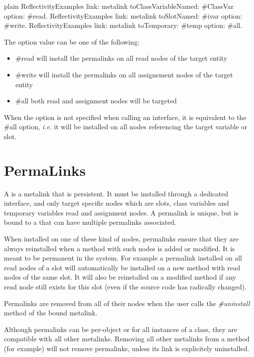 \documentclass[10pt,twoside,english]{_support/latex/sbabook/sbabook}
\begin{document}
\begin{displaycode}{plain}
ReflectivityExamples link: metalink toClassVariableNamed: #ClassVar option: #read.
ReflectivityExamples link: metalink toSlotNamed: #ivar option: #write.
ReflectivityExamples link: metalink toTemporary: #temp option: #all.
\end{displaycode}

The option value can be one of the following:

\begin{itemize}
\item \#read will install the permalinks on all read nodes of the target entity
\item \#write will install the permalinks on all assignement nodes of the target entity
\item \#all both read and assignment nodes will be targeted
\end{itemize}

When the option is not specified when calling an interface, it is equivalent to the \#all option, \textit{i.e.} it will be installed on all nodes referencing the target variable or slot.
\section{PermaLinks}
A  is a metalink that is persistent. It must be installed through a dedicated interface, and only target specific nodes which are slots, class variables and temporary variables read and assignment nodes. A permalink is unique, but is bound to a  that can have multiple permalinks associated.

When installed on one of these kind of nodes, permalinks ensure that they are always reinstalled when a method with such nodes is added or modified. It is meant to be permanent in the system. For example a permalink installed on all read nodes of a slot will automatically be installed on a new method with read nodes of the same slot. It will also be reinstalled on a modified method if any read node still exists for this slot (even if the source code has radically changed).

Permalinks are removed from all of their nodes when the user calls the \textit{\#uninstall} method of the bound metalink.

Although permalinks can be per-object or for all instances of a class, they are compatible with all other metalinks. Removing all other metalinks from a method (for example) will not remove permalinks, unless its link is explicitely uninstalled.
\end{document}
